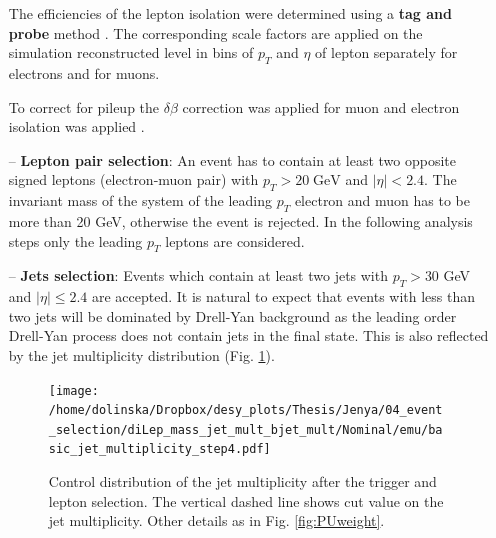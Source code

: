 \begin{itemize}
 The efficiencies of the lepton isolation were determined using a \textbf{tag and probe} method \cite{TWikiTP}. The corresponding scale factors are applied on the
 simulation reconstructed level in bins of $p_{T}$ and $\eta$ of lepton separately for electrons and for muons.
 
 To correct for pileup the $\delta\beta$ correction was applied for muon and electron isolation was applied \cite{TWikidbeta, Chatrchyan:2012xi}.
 \item [--] \textbf{Lepton pair selection}: An event has to contain at least two opposite signed leptons (electron-muon pair) with $p_{T} > 20 \; \textrm{GeV}$ and $|\eta| < 2.4$.
 The invariant mass of the system of the leading $p_{T}$ electron and muon has to be more than 20 GeV, otherwise the event is rejected. In the following analysis steps
 only the leading $p_{T}$ leptons are considered.
 \item [--] \textbf{Jets selection}: Events which contain at least two jets with $p_{T} > 30$ GeV and $|\eta| \leq 2.4$ are accepted. It is natural to expect
 that events with less than two jets will be dominated by Drell-Yan background as the leading order Drell-Yan process does not contain jets in the final state. This is also 
 reflected by the jet multiplicity distribution (Fig. \ref{fig:jetMultiSel}). 
 
 \begin{figure}[h]
  \centering
  \texttt{[image: /home/dolinska/Dropbox/desy\_plots/Thesis/Jenya/04\_event\_selection/diLep\_mass\_jet\_mult\_bjet\_mult/Nominal/emu/basic\_jet\_multiplicity\_step4.pdf]}
  \caption{Control distribution of the jet multiplicity after the trigger and lepton selection. The vertical dashed line shows cut value on the 
  jet multiplicity. Other details as in Fig. \ref{fig:PUweight}.}
  \label{fig:jetMultiSel}
 \end{figure}
 

\end{itemize}
